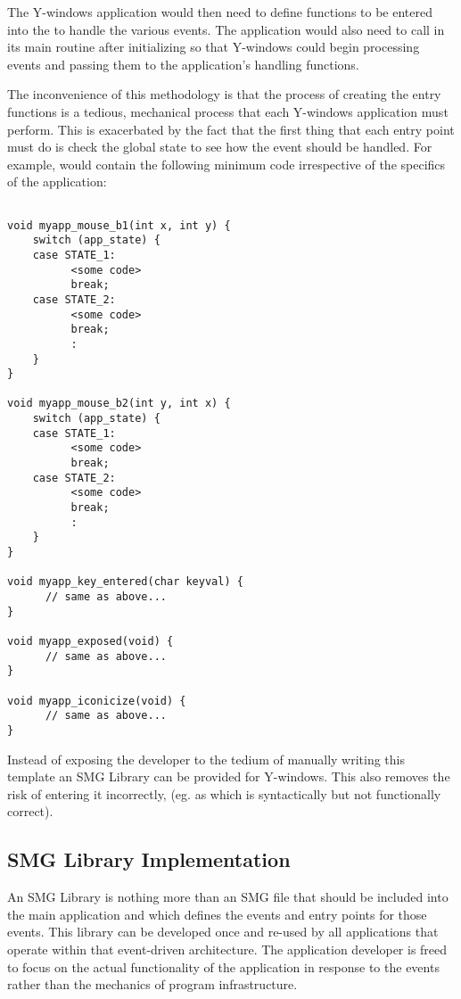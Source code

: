 The Y-windows application would then need to define functions to be
entered into the  to handle the various events.
The application would also need to call  in its
main routine after initializing so that Y-windows could begin processing
events and passing them to the application's handling functions.

The inconvenience of this methodology is that the process of creating
the entry functions is a tedious, mechanical process that each Y-windows
application must perform.  This is exacerbated by the fact that the first
thing that each entry point must do is check the global state to see how
the event should be handled.  For example,  would contain
the following minimum code irrespective of the specifics of the application:

\begin{verbatim}

void myapp_mouse_b1(int x, int y) {
    switch (app_state) {
    case STATE_1:
          <some code>
          break;
    case STATE_2:
          <some code>
          break;
          :
    }
}

void myapp_mouse_b2(int y, int x) {
    switch (app_state) {
    case STATE_1:
          <some code>
          break;
    case STATE_2:
          <some code>
          break;
          :
    }
}

void myapp_key_entered(char keyval) {
      // same as above...
}

void myapp_exposed(void) {
      // same as above...
}

void myapp_iconicize(void) {
      // same as above...
}

\end{verbatim}


Instead of exposing the developer to the tedium of manually writing
this template an SMG Library can be provided for Y-windows. This also
removes the risk of entering it incorrectly, (eg. as  which is syntactically but not
functionally correct).


\subsection{SMG Library Implementation}

An SMG Library is nothing more than an SMG file that should be \SMINCL
included into the main application and which defines the events and entry
points for those events.  This library can be developed once and re-used
by all applications that operate within that event-driven architecture.
The application developer is freed to focus on the actual functionality
of the application in response to the events rather than the mechanics
of program infrastructure.

